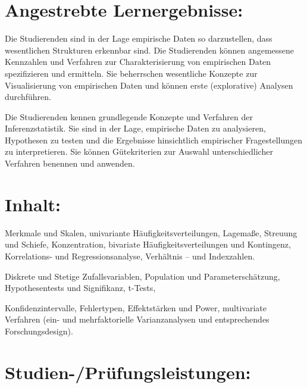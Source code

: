 \section*{Angestrebte
Lernergebnisse:\label{/mi-2017/modulbeschreibungen-master/MA_HCI_Modul_Statistical_Methods_for_HCI}}\label{angestrebte-lernergebnissepathlabelmi-2017modulbeschreibungen-mastermaux5fhciux5fmodulux5fstatisticalux5fmethodsux5fforux5fhci}

Die Studierenden sind in der Lage empirische Daten so darzustellen, dass
wesentlichen Strukturen erkennbar sind. Die Studierenden können
angemessene Kennzahlen und Verfahren zur Charakterisierung von
empirischen Daten spezifizieren und ermitteln. Sie beherrschen
wesentliche Konzepte zur Visualisierung von empirischen Daten und können
erste (explorative) Analysen durchführen.

Die Studierenden kennen grundlegende Konzepte und Verfahren der
Inferenzstatistik. Sie sind in der Lage, empirische Daten zu
analysieren, Hypothesen zu testen und die Ergebnisse hinsichtlich
empirischer Fragestellungen zu interpretieren. Sie können Gütekriterien
zur Auswahl unterschiedlicher Verfahren benennen und anwenden.

\section*{Inhalt:\label{/mi-2017/modulbeschreibungen-master/MA_HCI_Modul_Statistical_Methods_for_HCI}}\label{inhaltpathlabelmi-2017modulbeschreibungen-mastermaux5fhciux5fmodulux5fstatisticalux5fmethodsux5fforux5fhci}

Merkmale und Skalen, univariante Häufigkeitsverteilungen, Lagemaße,
Streuung und Schiefe, Konzentration, bivariate Häufigkeitsverteilungen
und Kontingenz, Korrelations- und Regressionsanalyse, Verhältnis -- und
Indexzahlen.

Diskrete und Stetige Zufallsvariablen, Population und
Parameterschätzung, Hypothesentests und Signifikanz, t-Tests,

Konfidenzintervalle, Fehlertypen, Effektstärken und Power, multivariate
Verfahren (ein- und mehrfaktorielle Varianzanalysen und entsprechendes
Forschungsdesign).

\section*{Studien-/Prüfungsleistungen:\label{/mi-2017/modulbeschreibungen-master/MA_HCI_Modul_Statistical_Methods_for_HCI}}\label{studien-pruxfcfungsleistungenpathlabelmi-2017modulbeschreibungen-mastermaux5fhciux5fmodulux5fstatisticalux5fmethodsux5fforux5fhci}

